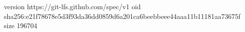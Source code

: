 version https://git-lfs.github.com/spec/v1
oid sha256:e21f78678e5d3f93da36dd0859d6a201ca6beebbeee44aaa11b11181aa73675f
size 196704
